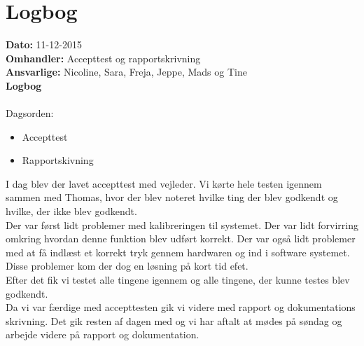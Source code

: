 \section{Logbog}

\textbf{Dato:} 11-12-2015\\
\textbf{Omhandler:} Accepttest og rapportskrivning\\
\textbf{Ansvarlige:} Nicoline, Sara, Freja, Jeppe, Mads og Tine\\
\textbf{Logbog}
\\
\\
Dagsorden:
\begin{itemize}
	\item Accepttest
	\item Rapportskivning
\end{itemize}

I dag blev der lavet accepttest med vejleder. Vi kørte hele testen igennem sammen med Thomas, hvor der blev noteret hvilke ting der blev godkendt og hvilke, der ikke blev godkendt.\\
Der var først lidt problemer med kalibreringen til systemet. Der var lidt forvirring omkring hvordan denne funktion blev udført korrekt. Der var også lidt problemer med at få indlæst et korrekt tryk gennem hardwaren og ind i software systemet. Disse problemer kom der dog en løsning på kort tid efet.\\
Efter det fik vi testet alle tingene igennem og alle tingene, der kunne testes blev godkendt.\\
Da vi var færdige med accepttesten gik vi videre med rapport og dokumentations skrivning. Det gik resten af dagen med og vi har aftalt at mødes på søndag og arbejde videre på rapport og dokumentation. 